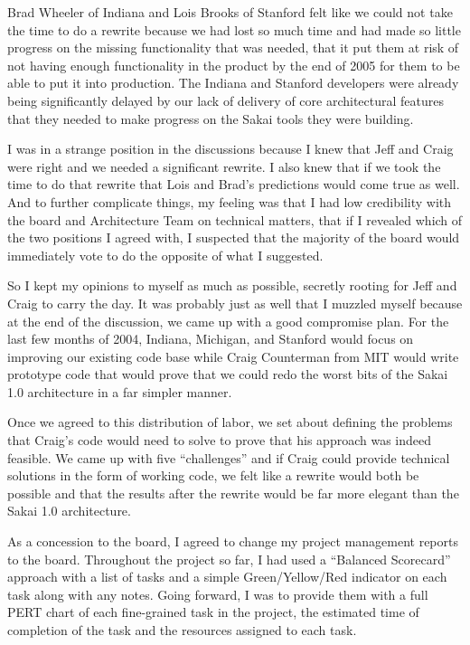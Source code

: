 \documentclass[12pt]{book}
\begin{document}
Brad Wheeler of Indiana and Lois
Brooks of Stanford felt like we could not take
the time to do a rewrite because we had lost
so much time and had made so little progress on the
missing functionality that was needed, that it
put them at risk of not having enough functionality
in the product by the end of 2005 for them
to be able to put it into production.  The
Indiana and Stanford developers were already
being significantly delayed by our lack of
delivery of core architectural features that they
needed to make progress on the Sakai tools they were
building.

I was in a strange position in the discussions
because I knew that Jeff and Craig were right
and we needed a significant rewrite.  I also knew that
if we took the time to do that rewrite that Lois and Brad's
predictions would come true as well.  And to further
complicate things, my feeling was that I had low credibility
with the board and Architecture Team on technical matters,
that if I revealed which of the two positions I
agreed with, I suspected that the majority of the board
would immediately vote to do the opposite of what I suggested.

So I kept my opinions to myself as much as possible,
secretly rooting for Jeff and Craig to carry the day.
It was probably just as well that I muzzled myself because
at the end of the discussion, we came up with a
good compromise plan.  For the last few months
of 2004, Indiana, Michigan, and Stanford would focus
on improving our existing code base while Craig
Counterman from MIT would write prototype code that would prove
that we could redo the worst bits of the Sakai 1.0
architecture in a far simpler manner.

Once we agreed to this distribution of labor, we set
about defining the problems that Craig's
code would need to solve to prove that his
approach was indeed feasible.  We came up with five
``challenges'' and if Craig could provide technical
solutions in the form of working code,
we felt like a rewrite would
both be possible and that the results after the
rewrite would be far more elegant than the Sakai 1.0
architecture.

As a concession to the board, I agreed to change my
project management reports to the board.  Throughout
the project so far, I had used a ``Balanced Scorecard''
approach with a list of tasks and a simple
Green\slash Yellow\slash Red indicator on each task along with
any notes.  Going forward, I was to provide them
with a full PERT chart of each fine-grained task
in the project, the estimated time of completion
of the task and the resources assigned to each task.
\end{document}
